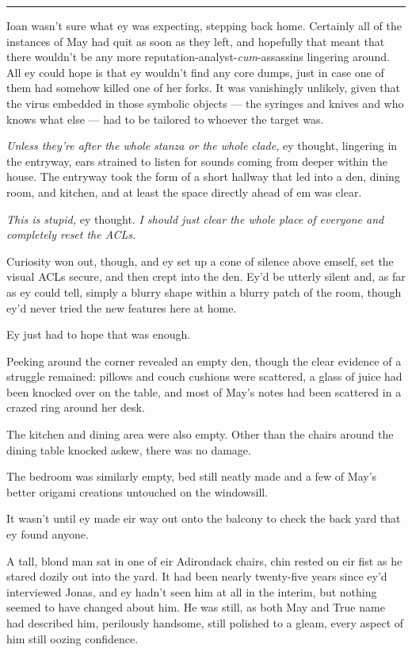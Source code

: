 \begin{center}\rule{0.5\linewidth}{0.5pt}\end{center}

Ioan wasn't sure what ey was expecting, stepping back home. Certainly all of the instances of May had quit as soon as they left, and hopefully that meant that there wouldn't be any more reputation-analyst-\emph{cum}-assassins lingering around. All ey could hope is that ey wouldn't find any core dumps, just in case one of them had somehow killed one of her forks. It was vanishingly unlikely, given that the virus embedded in those symbolic objects — the syringes and knives and who knows what else — had to be tailored to whoever the target was.

\emph{Unless they're after the whole stanza or the whole clade,} ey thought, lingering in the entryway, ears strained to listen for sounds coming from deeper within the house. The entryway took the form of a short hallway that led into a den, dining room, and kitchen, and at least the space directly ahead of em was clear.

\emph{This is stupid,} ey thought. \emph{I should just clear the whole place of everyone and completely reset the ACLs.}

Curiosity won out, though, and ey set up a cone of silence above emself, set the visual ACLs secure, and then crept into the den. Ey'd be utterly silent and, as far as ey could tell, simply a blurry shape within a blurry patch of the room, though ey'd never tried the new features here at home.

Ey just had to hope that was enough.

Peeking around the corner revealed an empty den, though the clear evidence of a struggle remained: pillows and couch cushions were scattered, a glass of juice had been knocked over on the table, and most of May's notes had been scattered in a crazed ring around her desk.

The kitchen and dining area were also empty. Other than the chairs around the dining table knocked askew, there was no damage.

The bedroom was similarly empty, bed still neatly made and a few of May's better origami creations untouched on the windowsill.

It wasn't until ey made eir way out onto the balcony to check the back yard that ey found anyone.

A tall, blond man sat in one of eir Adirondack chairs, chin rested on eir fist as he stared dozily out into the yard. It had been nearly twenty-five years since ey'd interviewed Jonas, and ey hadn't seen him at all in the interim, but nothing seemed to have changed about him. He was still, as both May and True name had described him, perilously handsome, still polished to a gleam, every aspect of him still oozing confidence.

